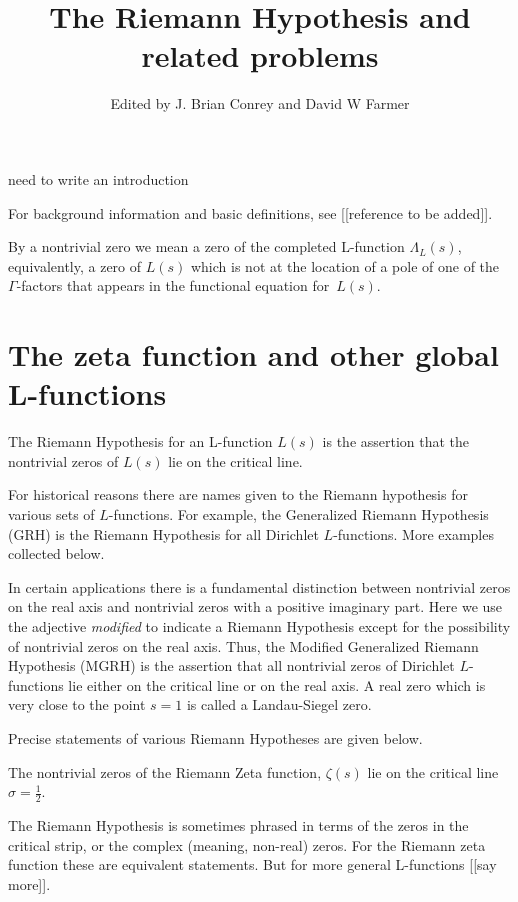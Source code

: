 \documentclass[12pt,letterpaper, reqno]{aimpl}
\begin{document}
\title{The Riemann Hypothesis and related problems}
\author{Edited by J. Brian Conrey and David W Farmer}


\maketitle

need to write an introduction

For background information and basic definitions,
see [[reference to be added]]. 

By a nontrivial zero we mean a zero of the completed L-function
$\Lambda_L(s)$, equivalently, a zero of $L(s)$ which is not at the
location of a pole of one of the $\Gamma$-factors that appears in
the functional equation for~$L(s)$.

\section{The zeta function and other global L-functions}


The Riemann Hypothesis for an L-function $L(s)$ is the assertion that the
nontrivial zeros of $L(s)$ lie on the
critical line.  

For historical reasons there are
names given to the Riemann hypothesis for various sets
of $L$-functions.  For example, 
the Generalized Riemann Hypothesis (GRH) is
the Riemann Hypothesis for all Dirichlet $L$-functions.
More examples collected below.

In certain applications there is a fundamental distinction
between nontrivial zeros on the real axis and 
nontrivial zeros with a positive imaginary part.
Here we use the adjective {\it modified} to indicate
a Riemann Hypothesis except for the possibility
of nontrivial zeros on the real axis.  Thus, the
Modified Generalized Riemann Hypothesis (MGRH) is
the assertion that all nontrivial zeros of 
Dirichlet $L$-functions lie either on the 
critical line or on the real axis.
A real zero which is very close to the point $s=1$ is
called a Landau-Siegel zero.  

Precise statements of various Riemann Hypotheses are given below.

\begin{problemblock}
\begin{problem}[1.1] The nontrivial zeros of the Riemann Zeta function,
$\zeta(s)$ lie on the critical line $\sigma=\frac12$.
\end{problem}

The Riemann Hypothesis is sometimes phrased in terms of the
zeros in the critical strip, or the
complex (meaning, non-real) zeros.  For the Riemann zeta function
these are equivalent statements.  But for more general L-functions
[[say more]].

\end{problemblock}
\end{document}
